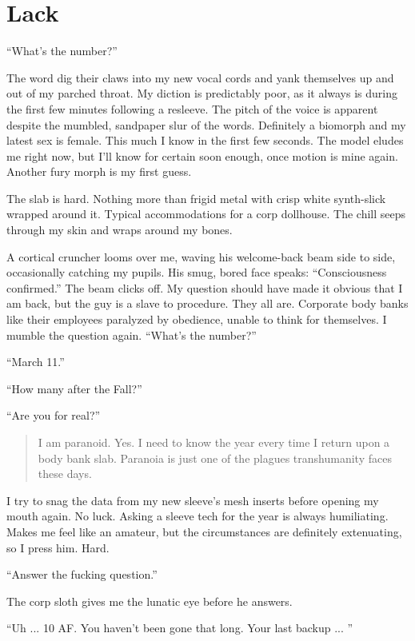 \chapter{Lack}
\label{chap:lack}

``What's the number?''

The word dig their claws into my new vocal cords and yank themselves up and out of my parched throat. My diction is predictably poor, as it always is during the first few minutes following a resleeve. The pitch of the voice is apparent despite the mumbled, sandpaper slur of the words. Definitely a biomorph and my latest sex is female. This much I know in the first few seconds. The model eludes me right now, but I'll know for certain soon enough, once motion is mine again. Another fury morph is my first guess.

The slab is hard. Nothing more than frigid metal with crisp white synth-slick wrapped around it. Typical accommodations for a corp dollhouse. The chill seeps through my skin and wraps around my bones.

A cortical cruncher looms over me, waving his welcome-back beam side to side, occasionally catching my pupils. His smug, bored face speaks: ``Consciousness confirmed.'' The beam clicks off. My question should have made it obvious that I am back, but the guy is a slave to procedure. They all are. Corporate body banks like their employees paralyzed by obedience, unable to think for themselves. I mumble the question again. ``What's the number?''

``March 11.''

``How many after the Fall?''

``Are you for real?''

\begin{quotation} I am paranoid. Yes. I need to know the year every time I return upon a body bank slab. Paranoia is just one of the plagues transhumanity faces these days. \end{quotation}

I try to snag the data from my new sleeve's mesh inserts before opening my mouth again. No luck. Asking a sleeve tech for the year is always humiliating. Makes me feel like an amateur, but the circumstances are definitely extenuating, so I press him. Hard.

``Answer the fucking question.''

The corp sloth gives me the lunatic eye before he answers.

``Uh ... 10 AF. You haven't been gone that long. Your last backup ... ''


